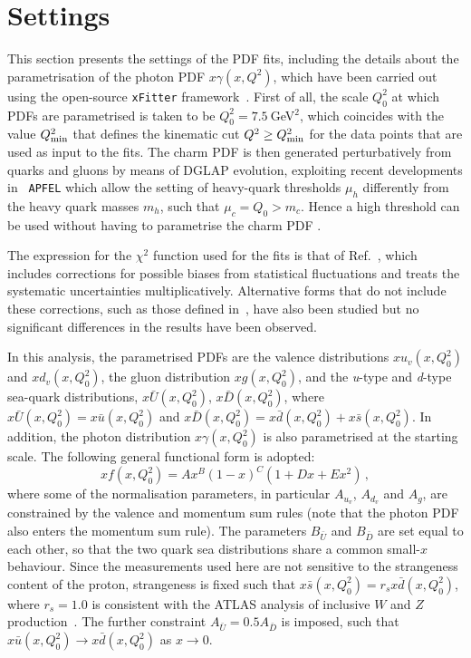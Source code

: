 \section{Settings}
\label{sec:fitsettings}

This section presents the settings of the PDF fits, including the details about the
parametrisation of the photon PDF $x\gamma(x,Q^2)$, which have been
carried out using the open-source {\tt xFitter}
framework~\cite{Alekhin:2014irh}.
%
First of all, the scale $Q_0^2$ at which PDFs are parametrised is taken to be
$Q_0^2 = 7.5~$GeV$^2$, which coincides with the value $Q_{\rm min}^2$ that defines
the kinematic cut $Q^2 \ge Q_{\rm min}^2$ for the
data points that are used as input to the fits.
%
The charm PDF is then generated perturbatively from quarks and gluons by
means of DGLAP evolution, exploiting recent developments in {\tt
  APFEL} which allow the setting of heavy-quark thresholds $\mu_h$
differently from the heavy quark masses $m_h$, such that
$\mu_c=Q_0 > m_c$. Hence a high threshold can be used without having to parametrise the charm PDF \cite{current:work}.

The expression for the $\chi^2$  function used for the fits is that
of Ref.~\cite{Aaron:2012qi}, which
includes corrections for possible 
biases from statistical fluctuations and treats the systematic uncertainties
multiplicatively.
%
Alternative forms that do not include these corrections, such as those
defined in~\cite{Aaron:2009aa,Abramowicz:2015mha},
have also been studied but no significant differences
in the results have been observed.
%

In this analysis, the parametrised PDFs are the valence distributions
$xu_{v}(x,Q_0^2)$ and $xd_{v}(x,Q_0^2)$, the gluon distribution $xg(x,Q_0^2)$, and the
\textit{u}-type and \textit{d}-type sea-quark distributions,
$x\bar{U}(x,Q_0^2)$, $x\bar{D}(x,Q_0^2)$, where $x\bar{U}(x,Q_0^2) = x\bar{u}(x,Q_0^2)$ and
$x\bar{D}(x,Q_0^2) = x\bar{d}(x,Q_0^2) + x\bar{s}(x,Q_0^2)$.
%
In addition, the photon distribution $x\gamma(x,Q_0^2)$ is also parametrised at the starting scale.
%
The following general functional form is adopted:
\begin{equation}
  \label{eq:parametrization}
xf(x, Q_0^2) = Ax^{B}(1-x)^{C}(1+Dx+Ex^{2}) \, ,
\end{equation}
where some of the normalisation parameters, in particular $A_{u_{v}}$,
$A_{d_{v}}$ and $A_{g}$, are constrained by the valence and momentum
sum rules (note that the photon PDF also enters the momentum sum rule).
%
The parameters $B_{\bar{U}}$ and $B_{\bar{D}}$ are set equal to each
other, so that the two quark sea distributions share a common
small-$x$ behaviour.
%
Since the measurements used here are not sensitive to the strangeness
content of the proton, strangeness is fixed such that $x\bar{s} (x, Q_0^2) = r_sx\bar{d}(x,Q_0^2)$, where
$r_s=1.0$ is consistent with the ATLAS analysis of inclusive $W$
and $Z$ production~\cite{Aad:2012sb,Aaboud:2016btc}.
%
The further constraint $A_{\bar{U}} = 0.5 A_{\bar{D}}$ is imposed,
such that $x\bar{u}(x,Q_0^2) \to x\bar{d}(x,Q_0^2)$ as $x \to 0$.  

